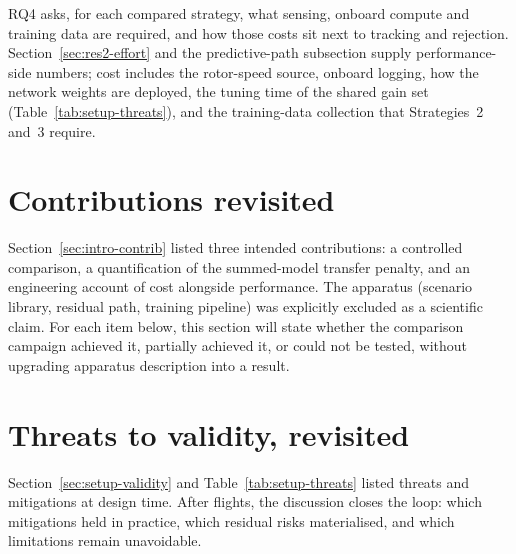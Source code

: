 RQ4 asks, for each compared strategy, what sensing, onboard compute and training data are required,
and how those costs sit next to tracking and rejection. Section~\ref{sec:res2-effort} and the
predictive-path subsection supply performance-side numbers; cost includes the rotor-speed source,
onboard logging, how the network weights are deployed, the tuning time of the shared gain set
(Table~\ref{tab:setup-threats}), and the training-data collection that Strategies~2 and~3 require.


\section{Contributions revisited}
\label{sec:disc-contrib}

Section~\ref{sec:intro-contrib} listed three intended contributions: a controlled comparison,
a quantification of the summed-model transfer penalty, and an engineering account of cost alongside
performance. The apparatus (scenario library, residual path, training pipeline) was explicitly
excluded as a scientific claim. For each item below, this section will state whether the
comparison campaign achieved it, partially achieved it, or could not be tested, without upgrading apparatus
description into a result.




\section{Threats to validity, revisited}
\label{sec:disc-validity}

Section~\ref{sec:setup-validity} and Table~\ref{tab:setup-threats} listed threats and mitigations
at design time. After flights, the discussion closes the loop: which mitigations held in practice,
which residual risks materialised, and which limitations remain unavoidable.

